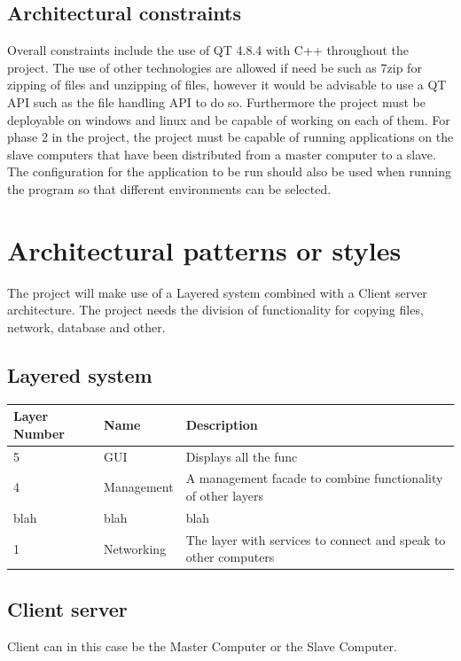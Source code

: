 \documentclass[a4paper,12pt,final]{article}
\begin{document}
\subsection{Architectural constraints}
Overall constraints include the use of QT 4.8.4 with C++ throughout the project. The use of other technologies are allowed if need be such as 7zip for zipping of files and unzipping of files, however it would be advisable to use a QT API such as the file handling API to do so. Furthermore the project must be deployable on windows and linux and be capable of working on each of them.
\vspace{6pt}\newline
For phase 2 in the project, the project must be capable of running applications on the slave computers that have been distributed from a master computer to a slave. The configuration for the application to be run should also be used when running the program so that different environments can be selected.

\section{Architectural patterns or styles}
The project will make use of a Layered system combined with a Client server architecture. The project  needs the division of functionality for copying files, network, database and other.
\vspace{6pt}\newline
\subsection{Layered system}
\begin{tabular}{|l|l|p{8cm}|}   
\hline
Layer Number & Name & Description\\
\hline
5 & GUI & Displays all the func\\
\hline
4 & Management & A management facade to combine functionality of other layers\\
\hline
blah & blah & blah\\
\hline
1 & Networking & The layer with services to connect and speak to other computers\\
\hline
\end{tabular}

\subsection{Client server}
Client can in this case be the Master Computer or the Slave Computer. 
\end{document}
